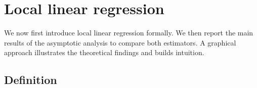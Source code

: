 


\section{Local linear regression} \label{sec:local_linear_regression}

We now first introduce local linear regression formally.
We then report the main results of the asymptotic analysis to compare both estimators.
A graphical approach illustrates the theoretical findings and builds intuition.

\subsection{Definition} \label{subsec:definition}

